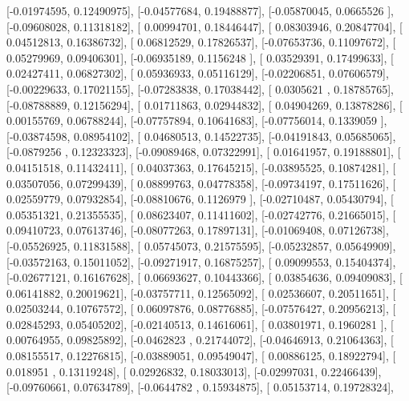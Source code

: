 \documentclass{article}
\begin{document}
       [-0.01974595,  0.12490975],
       [-0.04577684,  0.19488877],
       [-0.05870045,  0.0665526 ],
       [-0.09608028,  0.11318182],
       [ 0.00994701,  0.18446447],
       [ 0.08303946,  0.20847704],
       [ 0.04512813,  0.16386732],
       [ 0.06812529,  0.17826537],
       [-0.07653736,  0.11097672],
       [ 0.05279969,  0.09406301],
       [-0.06935189,  0.1156248 ],
       [ 0.03529391,  0.17499633],
       [ 0.02427411,  0.06827302],
       [ 0.05936933,  0.05116129],
       [-0.02206851,  0.07606579],
       [-0.00229633,  0.17021155],
       [-0.07283838,  0.17038442],
       [ 0.0305621 ,  0.18785765],
       [-0.08788889,  0.12156294],
       [ 0.01711863,  0.02944832],
       [ 0.04904269,  0.13878286],
       [ 0.00155769,  0.06788244],
       [-0.07757894,  0.10641683],
       [-0.07756014,  0.1339059 ],
       [-0.03874598,  0.08954102],
       [ 0.04680513,  0.14522735],
       [-0.04191843,  0.05685065],
       [-0.0879256 ,  0.12323323],
       [-0.09089468,  0.07322991],
       [ 0.01641957,  0.19188801],
       [ 0.04151518,  0.11432411],
       [ 0.04037363,  0.17645215],
       [-0.03895525,  0.10874281],
       [ 0.03507056,  0.07299439],
       [ 0.08899763,  0.04778358],
       [-0.09734197,  0.17511626],
       [ 0.02559779,  0.07932854],
       [-0.08810676,  0.1126979 ],
       [-0.02710487,  0.05430794],
       [ 0.05351321,  0.21355535],
       [ 0.08623407,  0.11411602],
       [-0.02742776,  0.21665015],
       [ 0.09410723,  0.07613746],
       [-0.08077263,  0.17897131],
       [-0.01069408,  0.07126738],
       [-0.05526925,  0.11831588],
       [ 0.05745073,  0.21575595],
       [-0.05232857,  0.05649909],
       [-0.03572163,  0.15011052],
       [-0.09271917,  0.16875257],
       [ 0.09099553,  0.15404374],
       [-0.02677121,  0.16167628],
       [ 0.06693627,  0.10443366],
       [ 0.03854636,  0.09409083],
       [ 0.06141882,  0.20019621],
       [-0.03757711,  0.12565092],
       [ 0.02536607,  0.20511651],
       [ 0.02503244,  0.10767572],
       [ 0.06097876,  0.08776885],
       [-0.07576427,  0.20956213],
       [ 0.02845293,  0.05405202],
       [-0.02140513,  0.14616061],
       [ 0.03801971,  0.1960281 ],
       [ 0.00764955,  0.09825892],
       [-0.0462823 ,  0.21744072],
       [-0.04646913,  0.21064363],
       [ 0.08155517,  0.12276815],
       [-0.03889051,  0.09549047],
       [ 0.00886125,  0.18922794],
       [ 0.018951  ,  0.13119248],
       [ 0.02926832,  0.18033013],
       [-0.02997031,  0.22466439],
       [-0.09760661,  0.07634789],
       [-0.0644782 ,  0.15934875],
       [ 0.05153714,  0.19728324],
\end{document}
